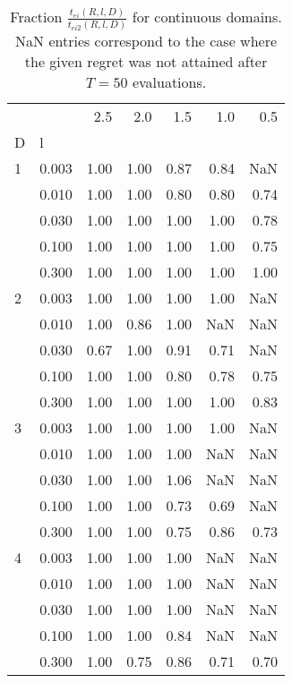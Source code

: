 \begin{table}
\centering
\caption{Fraction $\frac{t_{ei}(R,l,D)}{t_{ei2}(R,l,D)}$ for continuous 
    domains. NaN entries correspond to the case where the given regret was 
    not attained after $T=50$ evaluations.}
\label{fig:continuous_ei_vs_ei2}
\begin{tabular}{llrrrrr}
\toprule
  &       &   2.5 &   2.0 &   1.5 &   1.0 &   0.5 \\
D & l &       &       &       &       &       \\
\midrule
1 & 0.003 &  1.00 &  1.00 &  0.87 &  0.84 &   NaN \\
  & 0.010 &  1.00 &  1.00 &  0.80 &  0.80 &  0.74 \\
  & 0.030 &  1.00 &  1.00 &  1.00 &  1.00 &  0.78 \\
  & 0.100 &  1.00 &  1.00 &  1.00 &  1.00 &  0.75 \\
  & 0.300 &  1.00 &  1.00 &  1.00 &  1.00 &  1.00 \\
2 & 0.003 &  1.00 &  1.00 &  1.00 &  1.00 &   NaN \\
  & 0.010 &  1.00 &  0.86 &  1.00 &   NaN &   NaN \\
  & 0.030 &  0.67 &  1.00 &  0.91 &  0.71 &   NaN \\
  & 0.100 &  1.00 &  1.00 &  0.80 &  0.78 &  0.75 \\
  & 0.300 &  1.00 &  1.00 &  1.00 &  1.00 &  0.83 \\
3 & 0.003 &  1.00 &  1.00 &  1.00 &  1.00 &   NaN \\
  & 0.010 &  1.00 &  1.00 &  1.00 &   NaN &   NaN \\
  & 0.030 &  1.00 &  1.00 &  1.06 &   NaN &   NaN \\
  & 0.100 &  1.00 &  1.00 &  0.73 &  0.69 &   NaN \\
  & 0.300 &  1.00 &  1.00 &  0.75 &  0.86 &  0.73 \\
4 & 0.003 &  1.00 &  1.00 &  1.00 &   NaN &   NaN \\
  & 0.010 &  1.00 &  1.00 &  1.00 &   NaN &   NaN \\
  & 0.030 &  1.00 &  1.00 &  1.00 &   NaN &   NaN \\
  & 0.100 &  1.00 &  1.00 &  0.84 &   NaN &   NaN \\
  & 0.300 &  1.00 &  0.75 &  0.86 &  0.71 &  0.70 \\
\bottomrule
\end{tabular}
\end{table}
